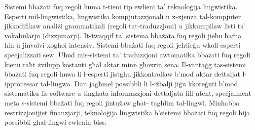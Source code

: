 \documentclass[]{../../metanetpaper}
\begin{document}
\begin{multicols}{2}
Sistemi bbażati fuq regoli huma t-tieni tip ewlieni ta’ teknoloġija lingwistika. Esperti mil-lingwistika, lingwistika kompjutazzjonali u x-xjenza tal-kompjuter jikkodifikaw analiżi grammatikali (regoli tat-traduzzjoni) u jikkumpilaw listi ta’ vokabularju (dizzjunarji). It-twaqqif ta’ sistema bbażata fuq regoli jieħu ħafna ħin u jinvolvi xogħol intensiv. Sistemi bbażati fuq regoli jeħtieġu wkoll esperti speċjalizzati sew. Uħud mis-sistemi ta’ traduzzjoni awtomatika bbażati fuq regoli kienu taħt żvilupp kostanti għal aktar minn għoxrin sena. Il-vantaġġ tas-sistemi bbażati fuq regoli huwa li l-esperti jistgħu jikkontrollaw b’mod aktar dettaljat l-ipproċessar tal-lingwa. Dan jagħmel possibbli li l-iżbalji jiġu kkoreġuti b’mod sistematiku fis-software u tingħata informazzjoni dettaljata lill-utent, speċjalment meta s-sistemi bbażati fuq regoli jintużaw għat- tagħlim tal-lingwi. Minħabba restrizzjonijiet finanzjarji, teknoloġija lingwistika b’sistemi bbażati fuq regoli hija possibbli għal-lingwi ewlenin biss.
\end{multicols}

\clearpage


\end{document}
